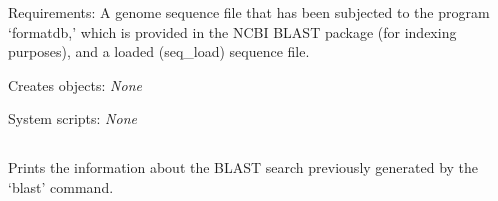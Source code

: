 \begin{description}
\begin{enumerate}
\end{enumerate}


\item{Requirements:} A genome sequence file that has been subjected to
                     the program `formatdb,' which is provided in the
                     NCBI BLAST package (for indexing purposes), and 
                     a loaded (seq\_load) sequence file. 


\item{Creates objects:} {\em None}


\item{System scripts:} {\em None}

\end{description}



\subsection[blast\_info]{  }



Prints the information about the BLAST search previously
generated by the `blast' command.


